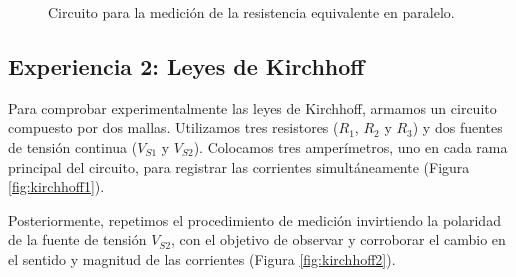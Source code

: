 \documentclass[11pt]{article}
\begin{document}
\begin{figure}[H]
    \centering
    \caption{Circuito para la medición de la resistencia equivalente en paralelo.}
    \label{fig:paralelo}
\end{figure}

\subsection*{Experiencia 2: Leyes de Kirchhoff}
Para comprobar experimentalmente las leyes de Kirchhoff, armamos un circuito compuesto por dos mallas. Utilizamos tres resistores ($R_1$, $R_2$ y $R_3$) y dos fuentes de tensión continua ($V_{S1}$ y $V_{S2}$). Colocamos tres amperímetros, uno en cada rama principal del circuito, para registrar las corrientes simultáneamente (Figura \ref{fig:kirchhoff1}).

Posteriormente, repetimos el procedimiento de medición invirtiendo la polaridad de la fuente de tensión $V_{S2}$, con el objetivo de observar y corroborar el cambio en el sentido y magnitud de las corrientes (Figura \ref{fig:kirchhoff2}).
\end{document}
